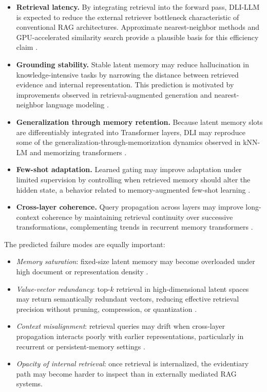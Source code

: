 \begin{itemize}
    \item \textbf{Retrieval latency.} By integrating retrieval into the forward pass, DLI-LLM is expected to reduce the external retriever bottleneck characteristic of conventional RAG architectures. Approximate nearest-neighbor methods and GPU-accelerated similarity search provide a plausible basis for this efficiency claim \cite{Jgou2011,Johnson2021}.
    \item \textbf{Grounding stability.} Stable latent memory may reduce hallucination in knowledge-intensive tasks by narrowing the distance between retrieved evidence and internal representation. This prediction is motivated by improvements observed in retrieval-augmented generation and nearest-neighbor language modeling \cite{Lewis2021,Khandelwal2020}.
    \item \textbf{Generalization through memory retention.} Because latent memory slots are differentiably integrated into Transformer layers, DLI may reproduce some of the generalization-through-memorization dynamics observed in kNN-LM and memorizing transformers \cite{Khandelwal2020,Wu2022}.
    \item \textbf{Few-shot adaptation.} Learned gating may improve adaptation under limited supervision by controlling when retrieved memory should alter the hidden state, a behavior related to memory-augmented few-shot learning \cite{Santoro2016}.
    \item \textbf{Cross-layer coherence.} Query propagation across layers may improve long-context coherence by maintaining retrieval continuity over successive transformations, complementing trends in recurrent memory transformers \cite{Bulatov2022}.
\end{itemize}

The predicted failure modes are equally important:

\begin{itemize}
    \item \textit{Memory saturation}: fixed-size latent memory may become overloaded under high document or representation density \cite{Graves2014,Wu2022}.
    \item \textit{Value-vector redundancy}: top-$k$ retrieval in high-dimensional latent spaces may return semantically redundant vectors, reducing effective retrieval precision without pruning, compression, or quantization \cite{Jgou2011,Johnson2021}.
    \item \textit{Context misalignment}: retrieval queries may drift when cross-layer propagation interacts poorly with earlier representations, particularly in recurrent or persistent-memory settings \cite{Bulatov2022}.
    \item \textit{Opacity of internal retrieval}: once retrieval is internalized, the evidentiary path may become harder to inspect than in externally mediated RAG systems.
\end{itemize}

